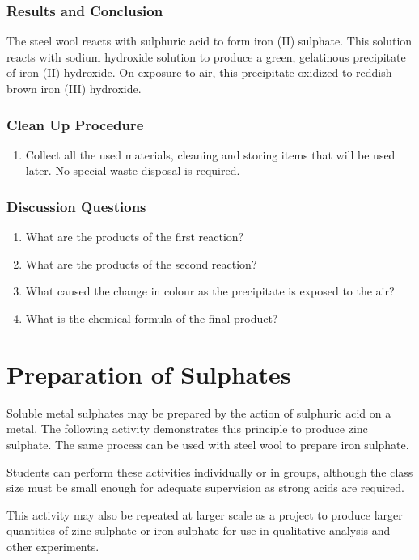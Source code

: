 \subsubsection*{Results and Conclusion}
The steel wool reacts with sulphuric acid to form iron (II) sulphate. This solution reacts with sodium hydroxide solution to produce a green, gelatinous precipitate of iron (II) hydroxide. On exposure to air, this precipitate oxidized to reddish brown iron (III) hydroxide.

\subsubsection*{Clean Up Procedure}
\begin{enumerate}
\item{Collect all the used materials, cleaning and storing items that will be used later. No special waste disposal is required.}
\end{enumerate}

\subsubsection*{Discussion Questions}
\begin{enumerate}
\item{What are the products of the first reaction?}
\item{What are the products of the second reaction?}
\item{What caused the change in colour as the precipitate is exposed to the air?}
\item{What is the chemical formula of the final product?}
\end{enumerate}

\section{Preparation of Sulphates}

Soluble metal sulphates may be prepared by the action of sulphuric acid on a metal. The following activity demonstrates this principle to produce zinc sulphate. The same process can be used with steel wool to prepare iron sulphate.

Students can perform these activities individually or in groups, although the class size must be small enough for adequate supervision as strong acids are required.

This activity may also be repeated at larger scale as a project to produce larger quantities of zinc sulphate or iron sulphate for use in qualitative analysis and other experiments.

